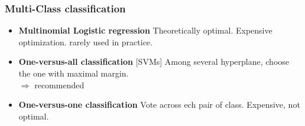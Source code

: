 \begin{frame}
\frametitle{Multi-Class classification}
\begin{itemize}
\item {\bf Multinomial Logistic regression} Theoretically optimal. Expensive optimization. rarely used in practice. 
\item {\bf One-versus-all classification} [SVMs] Among several
  hyperplane, choose the one with maximal margin. \\$\Longrightarrow$
  recommended
\item {\bf One-versus-one classification} Vote across ech pair of
  class. Expensive, not optimal.
\end{itemize}
\end{frame}
